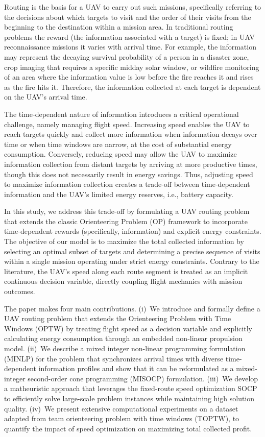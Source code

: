 \documentclass[11pt]{article}
\begin{document}
Routing is the basis for a UAV to carry out such missions, specifically referring to the decisions about which targets to visit and the order of their visits from the beginning to the destination within a mission area. In traditional routing problems the reward (the information associated with a target) is fixed; in UAV reconnaissance missions it varies with arrival time. For example, the information may represent the decaying survival probability of a person in a disaster zone, crop imaging that requires a specific midday solar window, or wildfire monitoring of an area where the information value is low before the fire reaches it and rises as the fire hits it. Therefore, the information collected at each target is dependent on the UAV's arrival time.

The time-dependent nature of information introduces a critical operational challenge, namely managing flight speed. Increasing speed enables the UAV to reach targets quickly and collect more information when information decays over time or when time windows are narrow, at the cost of substantial energy consumption. Conversely, reducing speed may allow the UAV to maximize information collection from distant targets by arriving at more productive times, though this does not necessarily result in energy savings. Thus, adjusting speed to maximize information collection creates a trade-off between time-dependent information and the UAV’s limited energy reserves, i.e., battery capacity.

In this study, we address this trade-off by formulating a UAV routing problem that extends the classic Orienteering Problem (OP) framework to incorporate time-dependent rewards (specifically, information) and explicit energy constraints. The objective of our model is to maximize the total collected information by selecting an optimal subset of targets and determining a precise sequence of visits within a single mission operating under strict energy constraints. Contrary to the literature, the UAV’s speed along each route segment is treated as an implicit continuous decision variable, directly coupling flight mechanics with mission outcomes.

The paper makes four main contributions. (i)~We introduce and formally define a UAV routing problem that extends the Orienteering Problem with Time Windows (OPTW) by treating flight speed as a decision variable and explicitly calculating energy consumption through an embedded non-linear propulsion model. (ii)~We describe a mixed integer non-linear programming formulation (MINLP) for the problem that synchronizes arrival times with diverse time-dependent information profiles and show that it can be reformulated as a mixed-integer second-order cone programming (MISOCP) formulation. (iii)~We develop a matheuristic approach that leverages the fixed-route speed optimization SOCP to efficiently solve large-scale problem instances while maintaining high solution quality. (iv)~We present extensive computational experiments on a dataset adapted from team orienteering problem with time windows (TOPTW), to quantify the impact of speed optimization on maximizing total collected profit.
\end{document}
